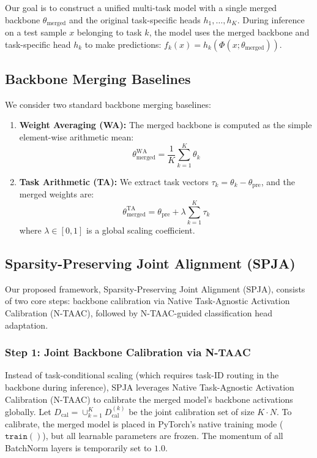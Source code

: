 \documentclass{article}
\theoremstyle{plain}
\theoremstyle{definition}
\theoremstyle{remark}
\begin{document}
Our goal is to construct a unified multi-task model with a single merged backbone $\theta_{\text{merged}}$ and the original task-specific heads $h_1, \dots, h_K$. During inference on a test sample $x$ belonging to task $k$, the model uses the merged backbone and task-specific head $h_k$ to make predictions: $f_k(x) = h_k(\Phi(x; \theta_{\text{merged}}))$.

\subsection{Backbone Merging Baselines}
We consider two standard backbone merging baselines:
\begin{enumerate}
    \item \textbf{Weight Averaging (WA):} The merged backbone is computed as the simple element-wise arithmetic mean:
    \begin{equation}
        \theta_{\text{merged}}^{\text{WA}} = \frac{1}{K}\sum_{k=1}^K \theta_k
    \end{equation}
    \item \textbf{Task Arithmetic (TA):} We extract task vectors $\tau_k = \theta_k - \theta_{\text{pre}}$, and the merged weights are:
    \begin{equation}
        \theta_{\text{merged}}^{\text{TA}} = \theta_{\text{pre}} + \lambda \sum_{k=1}^K \tau_k
    \end{equation}
    where $\lambda \in [0, 1]$ is a global scaling coefficient.
\end{enumerate}

\subsection{Sparsity-Preserving Joint Alignment (SPJA)}
Our proposed framework, Sparsity-Preserving Joint Alignment (SPJA), consists of two core steps: backbone calibration via Native Task-Agnostic Activation Calibration (N-TAAC), followed by N-TAAC-guided classification head adaptation.

\subsubsection{Step 1: Joint Backbone Calibration via N-TAAC}
Instead of task-conditional scaling (which requires task-ID routing in the backbone during inference), SPJA leverages Native Task-Agnostic Activation Calibration (N-TAAC) to calibrate the merged model's backbone activations globally. Let $D_{\text{cal}} = \cup_{k=1}^K D_{\text{cal}}^{(k)}$ be the joint calibration set of size $K \cdot N$. To calibrate, the merged model is placed in PyTorch's native training mode ($\mathtt{train()}$), but all learnable parameters are frozen. The momentum of all BatchNorm layers is temporarily set to $1.0$.
\end{document}
